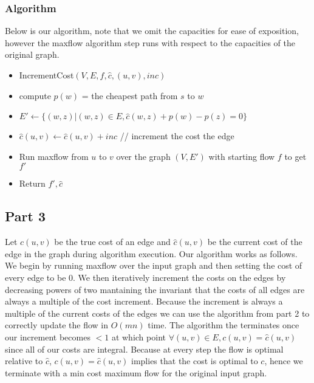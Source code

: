 \documentclass[a4paper]{article}
\begin{document}
\subsubsection*{Algorithm}
Below is our algorithm, note that we omit the capacities for ease of exposition, however
the maxflow algorithm step runs with respect to the capacities of the original graph.
\begin{itemize}
	\item IncrementCost$(V, E, f, \hat{c}, (u,v), inc)$
	\item compute $p(w)$ = the cheapest path from $s$ to $w$
	\item $E' \gets \{(w,z) | (w,z) \in E, \hat{c}(w,z) + p(w) - p(z) = 0\}$
	\item $\hat{c}(u,v) \gets \hat{c}(u,v) + inc$ // increment the cost the edge
	\item Run maxflow from $u$ to $v$ over the graph $(V, E')$ with starting flow $f$ to get $f'$
	\item Return $f', \hat{c}$
\end{itemize}

\subsection{Part 3}

Let $c(u,v)$ be the true cost of an edge and $\hat{c}(u,v)$ be the current cost of the edge in 
the graph during algorithm execution.
Our algorithm works as follows. We begin by running maxflow over the input
graph and then setting the cost of every edge to be 0. We then iteratively increment the 
costs on the edges by decreasing powers of two mantaining the invariant that
the costs of all edges are always a multiple of the cost increment. Because the increment is 
always a multiple of the current costs of the edges we can 
use the algorithm from part 2 to correctly update the flow in $O(mn)$ time. The algorithm the terminates 
once our increment becomes $< 1$ at which point $\forall (u,v)\in E, c(u,v) = \hat{c}(u,v)$ since all of 
our costs are integral. Because at every step the flow  is optimal relative to $\hat{c}$, $c(u,v) = \hat{c}(u,v)$
implies that the cost is optimal to $c$, hence we terminate with 
a min cost maximum flow for the original input graph.
\end{document}
